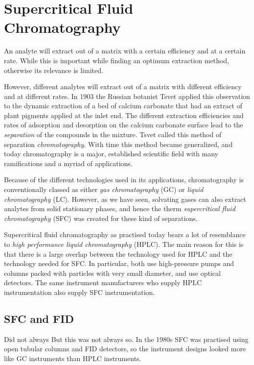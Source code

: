 \section{Supercritical Fluid Chromatography}

An analyte will extract out of a matrix with a certain efficiency and at a
certain rate. While this is important while finding an optimum extraction
method, otherwise its relevance is limited.

However, different analytes will extract out of a matrix with different
efficiency and at different rates. In 1903 the Russian botanist Tsvet
 applied this observation to the dynamic extraction of a
bed of calcium carbonate that had an extract of plant pigments applied at the
inlet end. The different extraction efficiencies and rates of adsorption and
desorption on the calcium carbonate surface lead to the \textit{separation} of
the compounds in the mixture. Tsvet called this method of separation
\textit{chromatography}. With time this method became generalized, and today
chromatography is a major, established scientific field with many ramifications
and a myriad of applications.

Because of the different technologies used in its applications, chromatography
is conventionally classed as either \textit{gas chromatography} (GC) or
\textit{liquid chromatography} (LC). However, as we have seen, solvating gases
can also extract analytes from solid stationary phases, and hence the therm
\textit{supercritical fluid chromatography} (SFC) was created for these kind of
separations. 

Supercritical fluid chromatography as practised today bears a lot of resemblance
to \textit{high performance liquid chromatography} (HPLC). The main reason for
this is that there is a large overlap between the technology used for HPLC and
the technology needed for SFC. In particular, both use high-pressure pumps and
columns packed with particles with very small diameter, and use optical
detectors. The same instrument manufacturers who supply HPLC instrumentation
also supply SFC instrumentation.


\subsection{SFC and FID}

Did not always But this was not always so. In the 1980s SFC was practised using open tubular
columns and FID detectors, so the instrument designs looked more like GC instruments than HPLC instruments. 

